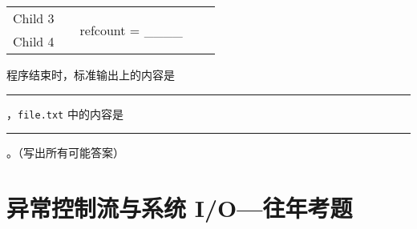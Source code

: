 \begin{problems}
\begin{table}[H]
\begin{tabular}{ccccc}
                \multicolumn{1}{|c|}{Child 3} & \multicolumn{1}{c|}{} & \multicolumn{1}{c|}{\multirow{2}{*}{refcount = \_\_\_\_}} & \multicolumn{1}{c|}{} & \multicolumn{1}{c|}{} \\ \cline{1-1}
                \multicolumn{1}{|c|}{Child 4} & \multicolumn{1}{c|}{} & \multicolumn{1}{c|}{} & \multicolumn{1}{c|}{} & \multicolumn{1}{c|}{} \\ \cline{1-1} \cline{3-3} \cline{5-5} 
            \end{tabular}
        \end{table}
        \qn 程序结束时，标准输出上的内容是 \rule{3.5cm}{0.25mm}，\verb|file.txt| 中的内容是 \rule{3.5cm}{0.25mm}。（写出所有可能答案）
    \end{problems}

\chapter{异常控制流与系统 I/O{---}往年考题}